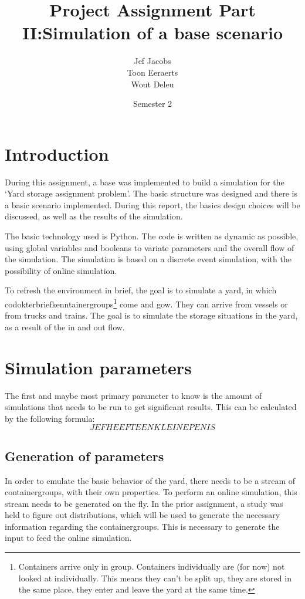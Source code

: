 \documentclass[]{article}
\title{Project Assignment Part II:\@ Simulation of a base scenario }
\author{Jef Jacobs \\ Toon Eeraerts \\ Wout Deleu}
\date{Semester 2}
\begin{document}
\setlength{\parindent}{0pt} \maketitle \tableofcontents \newpage %

\section{Introduction}
During this assignment, a base was implemented to build a simulation for the
`Yard storage assignment problem'. The basic structure was designed and there
is a basic scenario implemented. During this report, the basics design choices
will be discussed, as well as the results of the simulation.

The basic technology used is Python. The code is written as dynamic as
possible, using global variables and booleans to variate parameters and the
overall flow of the simulation. The simulation is based on a discrete event
simulation, with the possibility of online simulation.

To refresh the environment in brief, the goal is to simulate a yard, in which
codokterbriefkenntainergroups\footnote{Containers arrive only in group. Containers
	individually are (for now) not looked at individually. This means they can't be
	split up, they are stored in the same place, they enter and leave the yard at
	the same time.} come and gow. They can arrive from vessels or from trucks and
trains. The goal is to simulate the storage situations in the yard, as a result
of the in and out flow.

\section{Simulation parameters}
The first and maybe most primary parameter to know is the amount of simulations
that needs to be run to get significant results. This can be calculated by the
following formula: $$ JEF HEEFT EEN KLEINE PENIS $$

\subsection{Generation of parameters}
In order to emulate the basic behavior of the yard, there needs to be a stream
of containergroups, with their own properties. To perform an online simulation,
this stream needs to be generated on the fly. In the prior assignment, a study
was held to figure out distributions, which will be used to generate the
necessary information regarding the containergroups. This is necessary to
generate the input to feed the online simulation.
\end{document}
